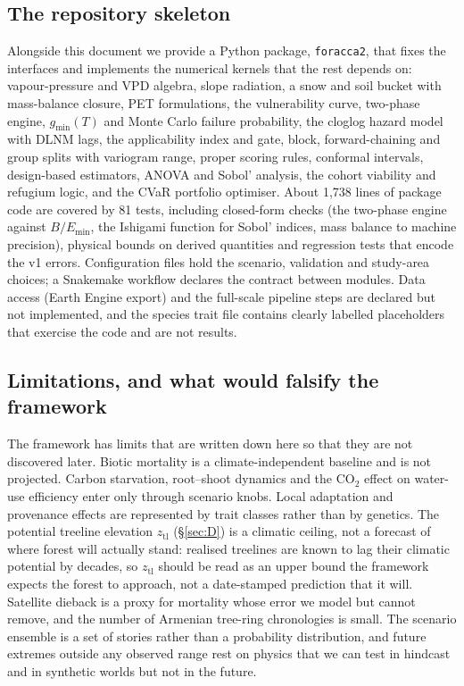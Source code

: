 \subsection{The repository skeleton}\label{sec:repo}
Alongside this document we provide a Python package, \texttt{foracca2}, that fixes the interfaces and implements the numerical kernels that the rest depends on: vapour-pressure and VPD algebra, slope radiation, a snow and soil bucket with mass-balance closure, PET formulations, the vulnerability curve, two-phase engine, $g_{\min}(T)$ and Monte Carlo failure probability, the cloglog hazard model with DLNM lags, the applicability index and gate, block, forward-chaining and group splits with variogram range, proper scoring rules, conformal intervals, design-based estimators, ANOVA and Sobol' analysis, the cohort viability and refugium logic, and the CVaR portfolio optimiser. About 1{,}738 lines of package code are covered by 81 tests, including closed-form checks (the two-phase engine against $B/E_{\min}$, the Ishigami function for Sobol' indices, mass balance to machine precision), physical bounds on derived quantities and regression tests that encode the v1 errors. Configuration files hold the scenario, validation and study-area choices; a Snakemake workflow declares the contract between modules. Data access (Earth Engine export) and the full-scale pipeline steps are declared but not implemented, and the species trait file contains clearly labelled placeholders that exercise the code and are not results.

\subsection{Limitations, and what would falsify the framework}
The framework has limits that are written down here so that they are not discovered later. Biotic mortality is a climate-independent baseline and is not projected. Carbon starvation, root--shoot dynamics and the CO$_2$ effect on water-use efficiency enter only through scenario knobs. Local adaptation and provenance effects are represented by trait classes rather than by genetics. The potential treeline elevation $z_{\text{tl}}$ (\S\ref{sec:D}) is a climatic ceiling, not a forecast of where forest will actually stand: realised treelines are known to lag their climatic potential by decades, so $z_{\text{tl}}$ should be read as an upper bound the framework expects the forest to approach, not a date-stamped prediction that it will. Satellite dieback is a proxy for mortality whose error we model but cannot remove, and the number of Armenian tree-ring chronologies is small. The scenario ensemble is a set of stories rather than a probability distribution, and future extremes outside any observed range rest on physics that we can test in hindcast and in synthetic worlds but not in the future.

